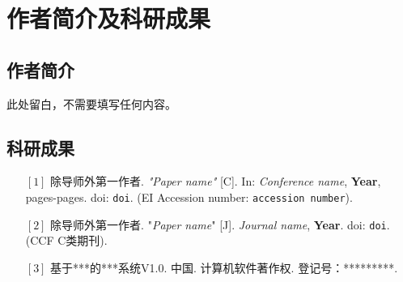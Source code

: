 \chapter{作者简介及科研成果}
\section*{作者简介}
此处留白，不需要填写任何内容。

\section*{科研成果}
\vskip 10pt
\begin{itemize}[itemsep= 7pt, labelsep= 10pt, leftmargin = 25pt, topsep = 10pt]
	\small
	\setlength{\baselineskip}{16pt}
	\item[{$\left[1\right]$}]
	除导师外第一作者. \textit{"Paper name"} [C]. In: \textit{Conference name}, \textbf{Year}, pages-pages.  doi: \texttt{doi}. (EI Accession number: \texttt{accession number}).
	
	\item[{$\left[2\right]$}]
	除导师外第一作者. "\textit{Paper name}" [J]. \textit{Journal name}, \textbf{Year}. doi: \texttt{doi}. (CCF C类期刊).
	
	\item[{$\left[3\right]$}]
	基于***的***系统V1.0. 中国. 计算机软件著作权. 登记号：*********.
\end{itemize}